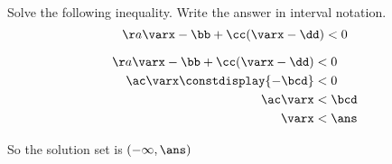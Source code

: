 

\edef\varx{\varx}



\pgfmathtruncatemacro{\bb}{\ans * (\aa + \cc) - \cc * \dd}


\pgfmathtruncatemacro{\ac}{\aa+\cc}
\pgfmathtruncatemacro{\bcd}{\bb+\cc*\dd}







 Solve the following inequality. Write the answer in interval notation.       
 \[ \aa \varx - \bb + \cc(\varx - \dd) < 0 \]



\begin{solution}
\[
	\begin{split}
		\aa \varx - \bb + \cc(\varx - \dd) &< 0\\
		\ac\varx \constdisplay{-\bcd} &<0\\
		\ac\varx & <\bcd \\
		\varx  & <\ans\\
	\end{split}
\]

So the solution set is 
$(-\infty, \ans)$

\end{solution}
